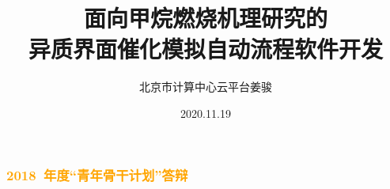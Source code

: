 \documentclass[cjk,slidestop,compress,mathserif,blue]{beamer}
\begin{document}

\title{面向甲烷燃烧机理研究的\\异质界面催化模拟自动流程软件开发}

\author[]{北京市计算中心\;云平台\:姜骏}
	
\institute[]{}
\date{\textrm{2020.11.19}}
\frame
{	
	\frametitle{\footnotesize{\textcolor{orange}{\textrm{2018~}年度“青年骨干计划”答辩}}}
\titlepage
}

\section*{}
\end{document}
